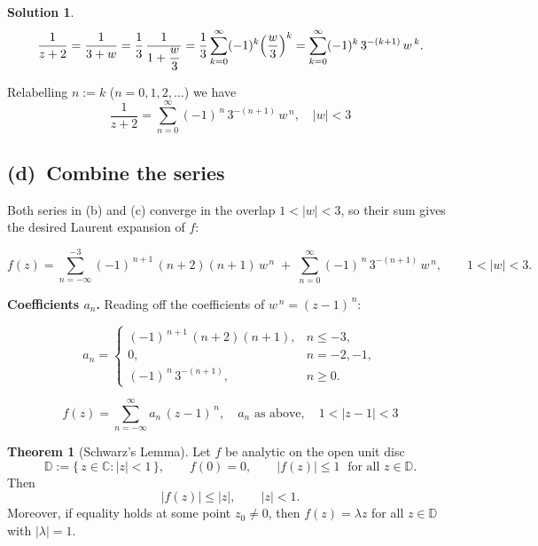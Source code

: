\documentclass[12pt]{article}
\theoremstyle{definition} %
\newtheorem{solution}{Solution}
\newtheorem{theorem}{Theorem}
\theoremstyle{plain} %
\begin{document}
\begin{solution}
   \[
      \frac1{z+2}
      =\frac1{3+w}
      =\frac1{3}\,\frac1{1+\dfrac{w}{3}}
      =\frac1{3}\sum_{k=0}^{\infty}(-1)^{k}\Bigl(\frac{w}{3}\Bigr)^{k}
      =\sum_{k=0}^{\infty}
           (-1)^{k}\,3^{-(k+1)}\,w^{\,k}.
   \]
   
   Relabelling $n:=k$ ($n=0,1,2,\dots$) we have
   \[
      \boxed{\;
         \frac1{z+2}
         =\sum_{n=0}^{\infty}
            (-1)^{\,n}\,3^{-(n+1)}\,w^{\,n},
         \quad |w|<3
      \;}
   \]
   
   \subsection*{(d) Combine the series}
   
   Both series in (b) and (c) converge in the overlap $1<|w|<3$, so their
   sum gives the desired Laurent expansion of $f$:
   
   \[
      f(z)
      =\sum_{n=-\infty}^{-3}
           (-1)^{\,n+1}\,(n+2)(n+1)\,w^{\,n}
        \;+\;
        \sum_{n=0}^{\infty}
           (-1)^{\,n}\,3^{-(n+1)}\,w^{\,n},
      \qquad 1<|w|<3 .
   \]
   
   \bigskip
   \noindent
   \textbf{Coefficients $a_n$.}
   Reading off the coefficients of $w^{\,n}=(z-1)^{\,n}$:
   
   \[
      a_n =
      \begin{cases}
         (-1)^{\,n+1}\,(n+2)(n+1), & n\le -3,\\[6pt]
         0,                        & n=-2,-1,\\[6pt]
         (-1)^{\,n}\,3^{-(n+1)},   & n\ge 0.
      \end{cases}
   \]
   
   \[
      \boxed{\displaystyle
         f(z)=\sum_{n=-\infty}^{\infty} a_n\,(z-1)^{\,n},
         \quad
         a_n\text{ as above},
         \quad
         1<|z-1|<3
      }
   \]
   \end{solution}
   \pagebreak
   \begin{theorem}[Schwarz’s Lemma]
      Let $f$ be analytic on the open unit disc
      \[
         \mathbb{D} := \{\,z\in\mathbb{C}:|z|<1\,\},
         \qquad
         f(0)=0,
         \qquad
         |f(z)|\le 1 \;\text{ for all } z\in\mathbb{D}.
      \]
      Then
      \[
         |f(z)|\le |z|,
         \qquad |z|<1.
      \]
      Moreover, if equality holds at some point $z_0\ne 0$, then
      $f(z)=\lambda z$ for all $z\in\mathbb{D}$ with $|\lambda|=1$.
      \end{theorem}
      
\end{document}
